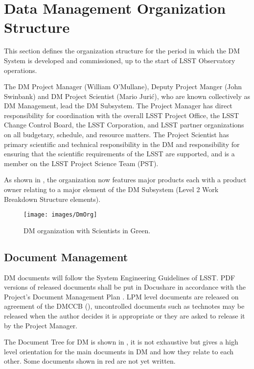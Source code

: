 \section{Data Management Organization Structure}

This section defines the organization structure for the period in which the DM System is developed and commissioned, up to the start of LSST Observatory operations.

The DM Project Manager (William O'Mullane), Deputy Project Manger (John Swinbank) and DM Project Scientist (Mario Juri\'c), who are known collectively as DM Management, lead the DM Subsystem.
The Project Manager has direct responsibility for coordination with the overall LSST Project Office, the LSST Change Control Board, the LSST Corporation, and LSST partner organizations on all budgetary, schedule, and resource matters.
The Project Scientist has primary scientific and technical responsibility in the DM and responsibility for ensuring that the scientific requirements of the LSST are supported, and is a member on the LSST Project Science Team (PST).

As shown in , the organization now features  major products  each with a product owner
relating to a major element of the DM Subsystem (Level 2 Work Breakdown Structure elements).

\begin{figure}[htbp]
\begin{center}
 \texttt{[image: images/DmOrg]}
\caption{DM organization with Scientists in Green. \label{fig:dmorg}}
\end{center}
\end{figure}


\subsection {Document Management} \label{sect:docman}

DM documents will follow the System Engineering Guidelines of LSST. PDF versions of released documents shall be put in Docushare in accordance with the Project's Document Management Plan . LPM level documents are released on agreement of the DMCCB (), uncontrolled documents such as technotes may be released when the author decides it is appropriate or they are asked to release it by the Project Manager. 

The Document Tree for DM is shown in , it is not exhaustive but gives a high level orientation for the main documents in DM and how they relate to each other. Some documents shown in red are not yet written.

